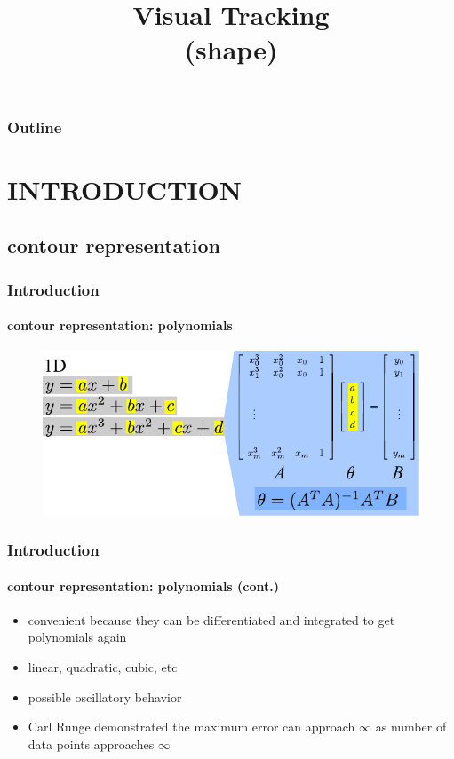 
\title{Visual Tracking \\ (shape)}
\begin{frame}[plain]\logoTechTower
	\titlepage
\end{frame}

\begin{frame}
\frametitle{Outline}
\logoCSIPCPL\logoTechTower
	\setcounter{tocdepth}{1}	
	\tableofcontents
\end{frame}

\section{INTRODUCTION}

\subsection{contour representation}
\begin{frame}
\frametitle{Introduction}
\framesubtitle{contour representation: polynomials}
\logoCSIPCPL\mypagenum
	\begin{figure}
		\includegraphics[width=1.0\textwidth]{figs/theory_curves_PolynomialFitting.pdf}
	\end{figure}
\end{frame}



\begin{frame}
\frametitle{Introduction}
\framesubtitle{contour representation: polynomials (cont.)}
\logoCSIPCPL\mypagenum
	\begin{itemize}
		\item convenient because they can be differentiated and integrated to get polynomials again
		\item linear, quadratic, cubic, etc
		\item possible oscillatory behavior
		\item Carl Runge demonstrated the maximum error can approach $\infty$ as number of data points approaches $\infty$
	\end{itemize}
\end{frame}




